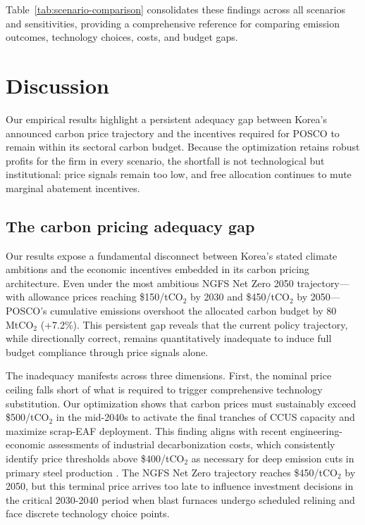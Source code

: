\documentclass[preprint,1p,authoryear]{elsarticle}
\begin{document}
Table~\ref{tab:scenario-comparison} consolidates these findings across all scenarios and sensitivities, providing a comprehensive reference for comparing emission outcomes, technology choices, costs, and budget gaps.

\section{Discussion}

Our empirical results highlight a persistent adequacy gap between Korea's announced carbon price trajectory and the incentives required for POSCO to remain within its sectoral carbon budget. Because the optimization retains robust profits for the firm in every scenario, the shortfall is not technological but institutional: price signals remain too low, and free allocation continues to mute marginal abatement incentives.

\subsection{The carbon pricing adequacy gap}

Our results expose a fundamental disconnect between Korea's stated climate ambitions and the economic incentives embedded in its carbon pricing architecture. Even under the most ambitious NGFS Net Zero 2050 trajectory—with allowance prices reaching \$150/tCO$_2$ by 2030 and \$450/tCO$_2$ by 2050—POSCO's cumulative emissions overshoot the allocated carbon budget by 80 MtCO$_2$ (+7.2\%). This persistent gap reveals that the current policy trajectory, while directionally correct, remains quantitatively inadequate to induce full budget compliance through price signals alone.

The inadequacy manifests across three dimensions. First, the nominal price ceiling falls short of what is required to trigger comprehensive technology substitution. Our optimization shows that carbon prices must sustainably exceed \$500/tCO$_2$ in the mid-2040s to activate the final tranches of CCUS capacity and maximize scrap-EAF deployment. This finding aligns with recent engineering-economic assessments of industrial decarbonization costs, which consistently identify price thresholds above \$400/tCO$_2$ as necessary for deep emission cuts in primary steel production \citep{MaterialEconomics2019, IEA2020steel}. The NGFS Net Zero trajectory reaches \$450/tCO$_2$ by 2050, but this terminal price arrives too late to influence investment decisions in the critical 2030-2040 period when blast furnaces undergo scheduled relining and face discrete technology choice points.
\end{document}
